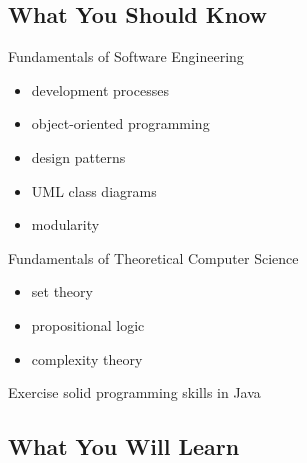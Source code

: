 \subsection{What You Should Know}

\begin{frame}{\myframetitle{}}
	\begin{mycolumns}
		\begin{note}{Fundamentals of Software Engineering}
			\begin{itemize}
				\item development processes
				\item object-oriented programming
				\item design patterns
				\item UML class diagrams
				\item modularity
			\end{itemize}
		\end{note}
	\mynextcolumn
		\begin{note}{Fundamentals of Theoretical Computer Science}
			\begin{itemize}
				\item set theory
				\item propositional logic
				\item complexity theory
			\end{itemize}
		\end{note}
		\begin{note}{Exercise}
			solid programming skills in Java

		\end{note}
	\end{mycolumns}
\end{frame}

\subsection{What You Will Learn}

\begin{frame}{\myframetitle{}}
	\lectureseriesoverview[1]
\end{frame}

